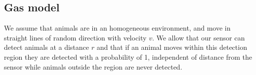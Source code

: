 \begin{comment}
        \end{itemize}
        \item \ref{p33}: {\bf  p33}
        \begin{itemize}
                \item \ref{p331}: {\bf  p331}
                \item \ref{p332}: {\bf  p332}
                \item \ref{p333}: {\bf  p333}
        \end{itemize}
        \item \ref{p141}: {\bf  p141}
        \item \ref{p24}: {\bf  p24}
        \begin{itemize}
                \item \ref{p241}: {\bf  p241}
                \item \ref{p242}: {\bf  p242}
                \item \ref{p243}: {\bf  p243}
        \end{itemize}
        \item \ref{p34}: {\bf  p34}
        \begin{itemize}
                \item \ref{p341}: {\bf  p341}
                \item \ref{p342}: {\bf  p342}
                \item \ref{p343}: {\bf  p343}
        \end{itemize}
\end{itemize}

\end{comment}



\subsection{Gas model} \label{gas}

We assume that animals are in an homogeneous environment, and move in straight lines of random direction with velocity $v$. We allow that our sensor can detect animals at a distance $r$ and that if an animal moves within this detection region they are detected with a probability of 1, independent of distance from the sensor while animals outside the region are never detected.

